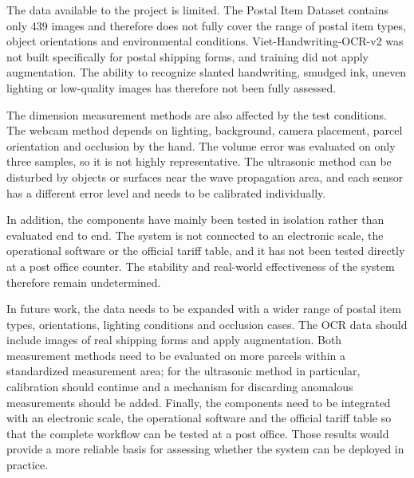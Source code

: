 The data available to the project is limited. The Postal Item Dataset contains only 439 images and therefore does not fully cover the range of postal item types, object orientations and environmental conditions. Viet-Handwriting-OCR-v2 was not built specifically for postal shipping forms, and training did not apply augmentation. The ability to recognize slanted handwriting, smudged ink, uneven lighting or low-quality images has therefore not been fully assessed.

The dimension measurement methods are also affected by the test conditions. The webcam method depends on lighting, background, camera placement, parcel orientation and occlusion by the hand. The volume error was evaluated on only three samples, so it is not highly representative. The ultrasonic method can be disturbed by objects or surfaces near the wave propagation area, and each sensor has a different error level and needs to be calibrated individually.

In addition, the components have mainly been tested in isolation rather than evaluated end to end. The system is not connected to an electronic scale, the operational software or the official tariff table, and it has not been tested directly at a post office counter. The stability and real-world effectiveness of the system therefore remain undetermined.

In future work, the data needs to be expanded with a wider range of postal item types, orientations, lighting conditions and occlusion cases. The OCR data should include images of real shipping forms and apply augmentation. Both measurement methods need to be evaluated on more parcels within a standardized measurement area; for the ultrasonic method in particular, calibration should continue and a mechanism for discarding anomalous measurements should be added. Finally, the components need to be integrated with an electronic scale, the operational software and the official tariff table so that the complete workflow can be tested at a post office. Those results would provide a more reliable basis for assessing whether the system can be deployed in practice.

